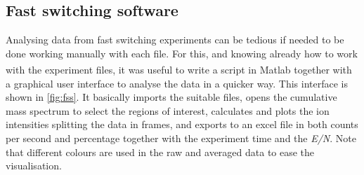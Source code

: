 












\subsection{Fast switching software}\label{sec:fs_data}
Analysing data from fast switching experiments can be tedious if needed to be done working manually with each file. %
%
For this, and knowing already how to work with the experiment files, it was useful to write a script in Matlab\textsuperscript{\textregistered}  together with a graphical user interface to analyse the data in a quicker way.
%
This interface is shown in \autoref{fig:fss}.
It basically imports the suitable files, opens the cumulative mass spectrum to select the regions of interest, calculates and plots the ion intensities splitting the data in frames, and exports to an excel file in both counts per second and percentage together with the experiment time and the \textit{E/N}.
%
Note that different colours are used in the raw and averaged data to ease the visualisation.


